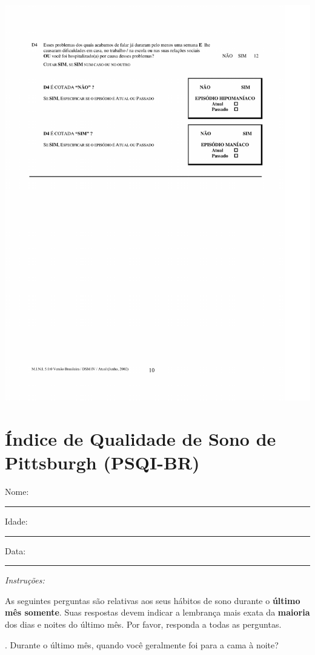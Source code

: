 \documentclass[chapter=TITLE,
               oneside,
               12pt,
               a4paper,
               english,
               brazil]{abntex2}    %
\begin{document}
\begin{anexosenv}
        \begin{center}
        \includegraphics[width=1\textwidth]{img/modulominimania02.pdf}
        \end{center}

    \chapter{Índice de Qualidade de Sono de Pittsburgh (PSQI-BR)}

    \noindent
    Nome: \rule{7cm}{0.4pt} Idade: \rule{1cm}{0.4pt} Data: \rule{3cm}{0.4pt}

    \noindent
    \textit{Instruções:}

    \noindent
    As seguintes perguntas são relativas aos seus hábitos de sono durante o
    \textbf{último mês somente}. Suas respostas devem indicar a lembrança
    mais exata da \textbf{maioria} dos dias e noites do último mês. Por favor,
    responda a todas as perguntas.

    . Durante o último mês, quando você geralmente foi para a cama à noite?


\end{anexosenv}
\end{document}
